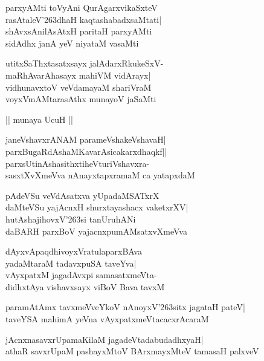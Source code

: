 \documentclass[twoside,12pt,openright]{book}
\def\S{\char'263}
\newcounter{shloka}[chapter]
\begin{document}
\begin{shloka}%
parxyAMti toVyAni QurAgarxvikaSxteV\\
rasAtaleV\S dhaH kaqtashabadxsaMtati|\\
shAvxsAnilAsAtxH paritaH parxyAMti\\
sidAdhx janA yeV niyataM vasaMti
\end{shloka}

\begin{shloka}%
utitxSaThxtasatxsayx jalAdarxRkukeSxV-\\
maRhAvarAhasayx mahiVM vidArayx|\\
vidhunavxtoV veVdamayaM shariVraM\\
voyxVmAMtarasAthx munayoV jaSaMti
\end{shloka}

\begin{center}
|| munaya UcuH ||
\end{center}
\begin{shloka}%
janeVshavxrANAM parameVshakeVshavaH|\\
parxBugaRdAshaMKavarAsicakarxdhaqkf||\\
parxsUtinAshasithxtiheVturiVshavxra-\\
sasxtXvXmeVva nAnayxtapxramaM ca yatapxdaM
\end{shloka}

\begin{shloka}%
pAdeVSu veVdAsatxva yUpadaMSATxrX\\
daMteVSu yajAcnxH shurxtayashacx vaketxrXV|\\
hutAshajihovxV\S si tanUruhANi\\
daBARH parxBoV yajacnxpumAMsatxvXmeVva
\end{shloka}

\begin{shloka}%
dAyxvApaqdhivoyxVratulaparxBAva\\
yadaMtaraM tadavxpuSA taveYva|\\
vAyxpatxM jagadAvxpi samasatxmeVta-\\
didhxtAya vishavxsayx viBoV Bava tavxM
\end{shloka}

\begin{shloka}%
paramAtAmx tavxmeVveYkoV nAnoyxV\S sitx jagataH pateV|\\
taveYSA mahimA yeVna vAyxpatxmeVtacacxrAcaraM
\end{shloka}

\begin{shloka}%
jAcnxnasavxrUpamaKilaM jagadeVtadabudadhxyaH|\\
athaR savxrUpaM pashayxMtoV BArxmayxMteV tamasaH palxveV
\end{shloka}
\end{document}
